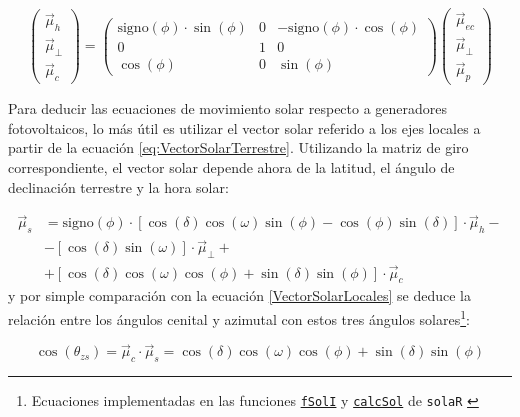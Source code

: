 \begin{equation}
\left(\begin{array}{c}
\vec{\mu}_{h}\\
\vec{\mu}_{\bot}\\
\vec{\mu}_{c}\end{array}\right)=\left(\begin{array}{ccc}
\mathrm{signo}(\phi)\cdot\sin(\phi) & 0 & -\mathrm{signo}(\phi)\cdot\cos(\phi)\\
0 & 1 & 0\\
\cos(\phi) & 0 & \sin(\phi)\end{array}\right)\left(\begin{array}{c}
\vec{\mu}_{ec}\\
\vec{\mu}_{\bot}\\
\vec{\mu}_{p}\end{array}\right)\end{equation}


Para deducir las ecuaciones de movimiento solar respecto a generadores
fotovoltaicos, lo más útil es utilizar el vector solar referido a
los ejes locales a partir de la ecuación \eqref{eq:VectorSolarTerrestre}.
Utilizando la matriz de giro correspondiente, el vector solar depende
ahora de la latitud, el ángulo de declinación terrestre y la hora
solar:

\begin{align}
\vec{\mu}_{s} & =\mathrm{signo}(\phi)\cdot\left[\cos\left(\delta\right)\cos\left(\omega\right)\sin\left(\phi\right)-\cos\left(\phi\right)\sin\left(\delta\right)\right]\cdot\vec{\mu}_{h}-\nonumber \\
 & -\left[\cos\left(\delta\right)\sin\left(\omega\right)\right]\cdot\vec{\mu}_{\bot}+\label{eq:VectorSolarLocales2}\\
 & +\left[\cos\left(\delta\right)\cos\left(\omega\right)\cos\left(\phi\right)+\sin\left(\delta\right)\sin\left(\phi\right)\right]\cdot\vec{\mu}_{c}\nonumber \end{align}
y por simple comparación con la ecuación \eqref{VectorSolarLocales}
se deduce la relación entre los ángulos cenital y azimutal con estos
tres ángulos solares\footnote{Ecuaciones implementadas en las
  funciones
  \href{http://search.r-project.org/R/library/solaR/html/fSolI.html}{\texttt{fSolI}}
  y
  \href{http://search.r-project.org/R/library/solaR/html/calcSol.html}{\texttt{calcSol}}
  de \texttt{solaR} \cite{Perpinan2012b}}: 

\begin{equation}
\cos\left(\theta_{zs}\right)=\vec{\mu}_{c}\cdot\vec{\mu}_{s}=\cos\left(\delta\right)\cos\left(\omega\right)\cos\left(\phi\right)+\sin\left(\delta\right)\sin\left(\phi\right)\label{eq:cosThetaZs}\end{equation}


